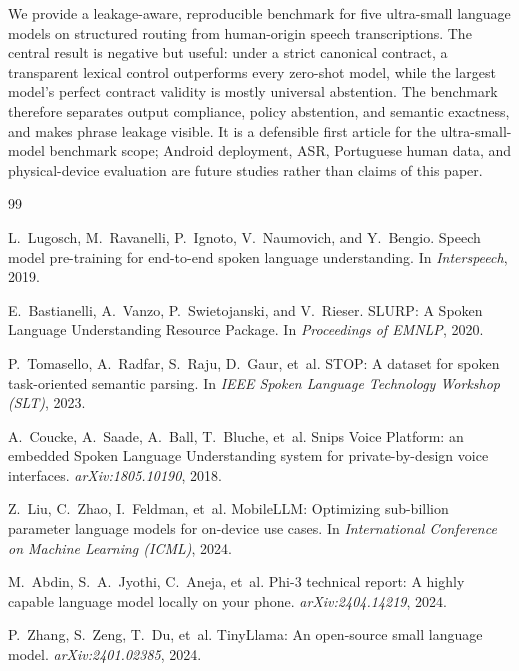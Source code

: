 \documentclass[12pt]{article}
\begin{document}
We provide a leakage-aware, reproducible benchmark for five ultra-small language models on structured routing from human-origin speech transcriptions. The central result is negative but useful: under a strict canonical contract, a transparent lexical control outperforms every zero-shot model, while the largest model's perfect contract validity is mostly universal abstention. The benchmark therefore separates output compliance, policy abstention, and semantic exactness, and makes phrase leakage visible. It is a defensible first article for the ultra-small-model benchmark scope; Android deployment, ASR, Portuguese human data, and physical-device evaluation are future studies rather than claims of this paper.

\begin{thebibliography}{99}

L.~Lugosch, M.~Ravanelli, P.~Ignoto, V.~Naumovich, and Y.~Bengio.
\newblock Speech model pre-training for end-to-end spoken language understanding.
\newblock In \textit{Interspeech}, 2019.

E.~Bastianelli, A.~Vanzo, P.~Swietojanski, and V.~Rieser.
\newblock SLURP: A Spoken Language Understanding Resource Package.
\newblock In \textit{Proceedings of EMNLP}, 2020.

P.~Tomasello, A.~Radfar, S.~Raju, D.~Gaur, et~al.
\newblock STOP: A dataset for spoken task-oriented semantic parsing.
\newblock In \textit{IEEE Spoken Language Technology Workshop (SLT)}, 2023.

A.~Coucke, A.~Saade, A.~Ball, T.~Bluche, et~al.
\newblock Snips Voice Platform: an embedded Spoken Language Understanding system for private-by-design voice interfaces.
\newblock \textit{arXiv:1805.10190}, 2018.

Z.~Liu, C.~Zhao, I.~Feldman, et~al.
\newblock MobileLLM: Optimizing sub-billion parameter language models for on-device use cases.
\newblock In \textit{International Conference on Machine Learning (ICML)}, 2024.

M.~Abdin, S.~A.~Jyothi, C.~Aneja, et~al.
\newblock Phi-3 technical report: A highly capable language model locally on your phone.
\newblock \textit{arXiv:2404.14219}, 2024.

P.~Zhang, S.~Zeng, T.~Du, et~al.
\newblock TinyLlama: An open-source small language model.
\newblock \textit{arXiv:2401.02385}, 2024.


\end{thebibliography}
\end{document}
